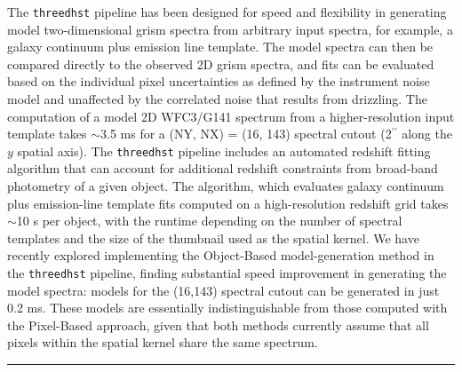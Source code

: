 \documentclass[preprint]{aastex}
\begin{document}
The \texttt{threedhst} pipeline has been designed for speed and flexibility in generating model two-dimensional grism spectra from arbitrary input spectra, for example, a galaxy continuum plus emission line template.  The model spectra can then be compared directly to the observed 2D grism spectra, and fits can be evaluated based on the individual pixel uncertainties as defined by the instrument noise model and unaffected by the correlated noise that results from drizzling.  The computation of a model 2D WFC3/G141 spectrum from a higher-resolution input template takes $\sim$3.5 ms for a (NY, NX) = (16, 143) spectral cutout (2$^{\prime\prime}$ along the $y$ spatial axis).  The \texttt{threedhst} pipeline includes an automated redshift fitting algorithm that can account for additional redshift constraints from broad-band photometry of a given object.  The algorithm, which evaluates galaxy continuum plus emission-line template fits computed on a high-resolution redshift grid takes $\sim$10 s per object, with the runtime depending on the number of spectral templates and the size of the thumbnail used as the spatial kernel.  We have recently explored implementing the Object-Based model-generation method in the \texttt{threedhst} pipeline, finding substantial speed improvement in generating the model spectra:  models for the (16,143) spectral cutout can be generated in just 0.2 ms.  These models are essentially indistinguishable from those computed with the Pixel-Based approach, given that both methods currently assume that all pixels within the spatial kernel share the same spectrum.  

\noindent\hfil\rule{0.5\textwidth}{.4pt}\hfil
\end{document}
